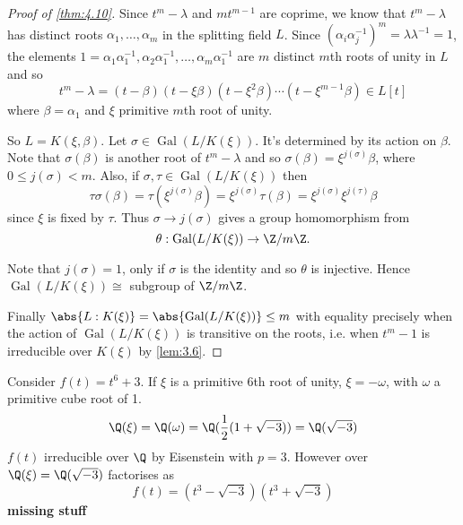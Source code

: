 \documentclass{article}
\DeclareMathOperator{\Gal}{Gal}
\begin{document}
\begin{proof}[Proof of \cref{thm:4.10}]
    Since $t^m - \lambda$ and $m t^{m-1}$ are coprime, we know that $t^m - \lambda$ has distinct roots $\alpha_1, \dotsc, \alpha_m$ in the splitting field $L$.
    Since $(\alpha_i \alpha_j^{-1})^m = \lambda \lambda^{-1} = 1$, the elements $1 = \alpha_1 \alpha_1^{-1}, \alpha_2 \alpha_1^{-1}, \dotsc, \alpha_m \alpha_1^{-1}$ are $m$ distinct $m$th roots of unity in $L$ and so
    \begin{equation*}
        t^m - \lambda = (t-\beta)(t-\xi\beta)(t-\xi^2 \beta)\dotsm (t-\xi^{m-1}\beta) \in L[t]
    \end{equation*}
    where $\beta = \alpha_1$ and $\xi$ primitive $m$th root of unity.

    So $L = K(\xi, \beta)$. Let $\sigma \in \Gal(L/K(\xi))$.
    It's determined by its action on $\beta$. Note that $\sigma(\beta)$ is another root of $t^m - \lambda$ and so $\sigma(\beta) = \xi^{j(\sigma)} \beta$, where $0 \leq j(\sigma) < m$.
    Also, if $\sigma, \tau \in \Gal(L/K(\xi))$ then
    \begin{equation*}
        \tau\sigma(\beta) = \tau(\xi^{j(\sigma)} \beta) = \xi^{j(\sigma)} \tau(\beta) = \xi^{j(\sigma)} \xi^{j(\tau)} \beta
    \end{equation*}
    since $\xi$ is fixed by $\tau$.
    Thus $\sigma \to j(\sigma)$ gives a group homomorphism from
    \begin{equation*}
        \theta:\Gal(L/K(\xi)) \to \Z/m\Z.
    \end{equation*}

    Note that $j(\sigma) = 1$, only if $\sigma$ is the identity and so $\theta$ is injective.
    Hence $\Gal(L/K(\xi)) \cong $ subgroup of $\Z/m\Z$.

    Finally $\abs{L:K(\xi)} = \abs{\Gal(L/K(\xi))} \leq m$ with equality precisely when the action of $\Gal(L/K(\xi))$ is transitive on the roots, i.e. when $t^m-1$ is irreducible over $K(\xi)$ by \cref{lem:3.6}.
\end{proof}

\begin{eg}
    Consider $f(t) = t^6 + 3$.
    If $\xi$ is a primitive 6th root of unity, $\xi = -\omega$, with $\omega$ a primitive cube root of 1.
    \begin{equation*}
        \Q(\xi) = \Q(\omega) = \Q(\frac{1}{2}(1 + \sqrt{-3})) = \Q(\sqrt{-3})
    \end{equation*}
    $f(t)$ irreducible over $\Q$ by Eisenstein with $p=3$.
    However over $\Q(\xi) = \Q(\sqrt{-3})$ factorises as
    \begin{equation*}
        f(t) = (t^3 - \sqrt{-3})(t^3 + \sqrt{-3})
    \end{equation*}
    \textbf{missing stuff}
\end{eg}
\end{document}
